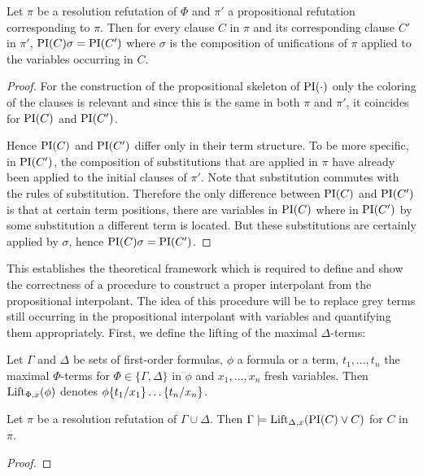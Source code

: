 \begin{lemma}
	Let $\pi$ be a resolution refutation of $\Phi$ and $\pi'$ a propositional refutation corresponding to $\pi$.
	Then for every clause $C$ in $\pi$ and its corresponding clause $C'$ in $\pi'$, $\PI(C)\sigma = \PI(C')$ where $\sigma$ is the composition of unifications of $\pi$ applied to the variables occurring in $C$.
\end{lemma}
\begin{proof}
	For the construction of the propositional skeleton of $\PI(\cdot)$ only the coloring of the clauses is relevant and since this is the same in both $\pi$ and $\pi'$, it coincides for $\PI(C)$ and $\PI(C')$.

	Hence $\PI(C)$ and $\PI(C')$ differ only in their term structure. 
	To be more specific, in $\PI(C')$, the composition of substitutions that are applied in $\pi$ have already been applied to the initial clauses of $\pi'$. 
	Note that substitution commutes with the rules of substitution.
	Therefore the only difference between $\PI(C)$ and $\PI(C')$ is that at certain term positions, there are variables in $\PI(C)$ where in $\PI(C')$ by some substitution a different term is located. 
	But these substitutions are certainly applied by $\sigma$, hence $\PI(C)\sigma = \PI(C')$.
\end{proof}

This establishes the theoretical framework which is required to define and show the correctness of a procedure to construct a proper interpolant from the propositional interpolant.
The idea of this procedure will be to replace grey terms still occurring in the propositional interpolant with variables and quantifying them appropriately.
First, we define the lifting of the maximal $\Delta$-terms:

\begin{defi}
	Let $\Gamma$ and $\Delta$ be sets of first-order formulas, 
	$\phi$ a formula or a term, $t_1, \ldots, t_n$ the maximal $\Phi$-terms for $\Phi \in \{\Gamma, \Delta\}$ in $\phi$ and $x_1, \ldots, x_n$ fresh variables.
	Then $\lift{\Phi}{\phi}{x}$ denotes $\phi\termsubst{t_1/x_1}\ldots\termsubst{t_n/x_n}$.
\end{defi}

\begin{lemma}
	Let $\pi$ be a resolution refutation of $\Gamma \cup \Delta$. 
	Then $\Gamma \entails \lift{\Delta}{ \PI(C) \lor C }{x} $ for $C$ in $\pi$.
\end{lemma}
\begin{proof}

\end{proof}

